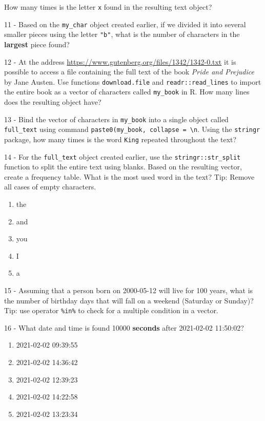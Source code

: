 \documentclass[
  12pt,
]{book}
\providecommand{\tightlist}{%
  \setlength{\itemsep}{0pt}\setlength{\parskip}{0pt}}
\begin{document}
How many times is the letter \texttt{\textquotesingle{}x\textquotesingle{}} found in the resulting text object?

11 -
Based on the \texttt{my\_char} object created earlier, if we divided it into several smaller pieces using the letter \texttt{"b"}, what is the number of characters in the \textbf{largest} piece found?

12 -
At the address \url{https://www.gutenberg.org/files/1342/1342-0.txt} it is possible to access a file containing the full text of the book \emph{Pride and Prejudice} by Jane Austen. Use functions \texttt{download.file} and \texttt{readr::read\_lines} to import the entire book as a vector of characters called \texttt{my\_book} in R. How many lines does the resulting object have?

13 -
Bind the vector of characters in \texttt{my\_book} into a single object called \texttt{full\_text} using command \texttt{paste0(my\_book,\ collapse\ =\ \textquotesingle{}\textbackslash{}n\textquotesingle{}}. Using the \texttt{stringr} package, how many times is the word \texttt{\textquotesingle{}King\textquotesingle{}} repeated throughout the text?

14 -
For the \texttt{full\_text} object created earlier, use the \texttt{stringr::str\_split} function to split the entire text using blanks. Based on the resulting vector, create a frequency table. What is the most used word in the text? Tip: Remove all cases of empty characters.

\begin{enumerate}
\def\labelenumi{\alph{enumi})}
\tightlist
\item
  the
\item
  and
\item
  you
\item
  I
\item
  a
\end{enumerate}

15 -
Assuming that a person born on 2000-05-12 will live for 100 years, what is the number of birthday days that will fall on a weekend (Saturday or Sunday)? Tip: use operator \texttt{\%in\%} to check for a multiple condition in a vector.

16 -
What date and time is found 10000 \textbf{seconds} after 2021-02-02 11:50:02?

\begin{enumerate}
\def\labelenumi{\alph{enumi})}
\tightlist
\item
  2021-02-02 09:39:55
\item
  2021-02-02 14:36:42
\item
  2021-02-02 12:39:23
\item
  2021-02-02 14:22:58
\item
  2021-02-02 13:23:34
\end{enumerate}
\end{document}
